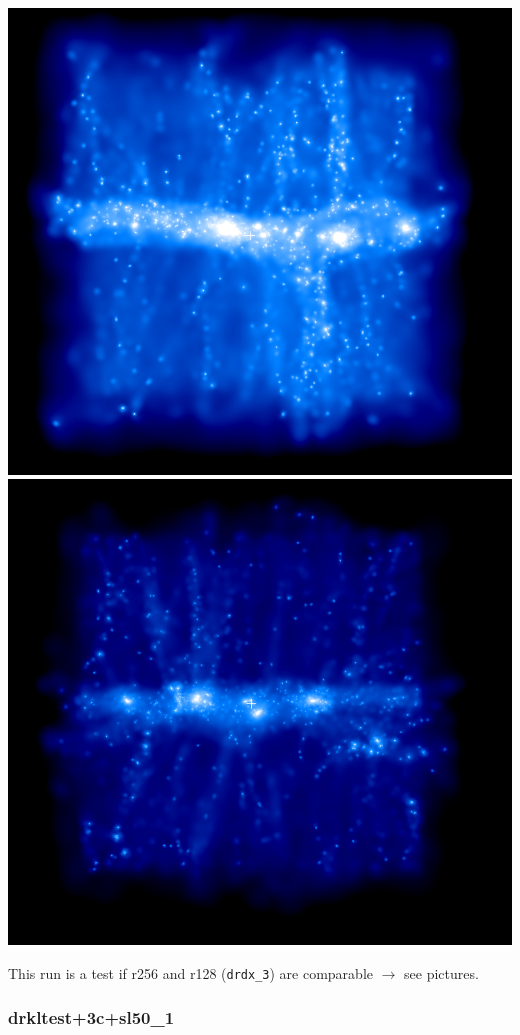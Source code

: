 \documentclass[a4paper,11pt,fleqn,oneside]{book}
\begin{document}
\includegraphics[scale=0.2]{drdx_3_r256/4.png} 
\includegraphics[scale=0.2]{drdx_3_r256/3.png} 


This run is a test if r256 and r128 (\texttt{drdx\_3}) 
are comparable $\rightarrow$ see pictures. 


\newpage
\subsubsection{drkltest+3c+sl50\_1}
\end{document}
